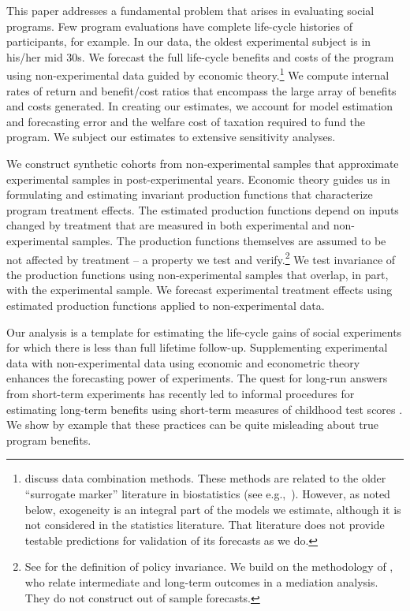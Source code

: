 This paper addresses a fundamental problem that arises in evaluating social programs. Few program evaluations have complete life-cycle histories of participants, for example. In our data, the oldest experimental subject is in his/her mid 30s. We forecast the full life-cycle benefits and costs of the program using non-experimental data guided by economic theory.\footnote{\citet{Ridder_Moffitt_2007_hbk_metricsdata} discuss data combination methods. These methods are related to the older ``surrogate marker'' literature in biostatistics (see e.g.,\ \citealp{Prentice_1989_Surrogate_SiM}). However, as noted below, exogeneity is an integral part of the models we estimate, although it is not considered in the statistics literature. That literature does not provide testable predictions for validation of its forecasts as we do.} We compute internal rates of return and benefit/cost ratios that encompass the large array of benefits and costs generated. In creating our estimates, we account for model estimation and forecasting error and the welfare cost of taxation required to fund the program. We subject our estimates to extensive sensitivity analyses.

We construct synthetic cohorts from non-experimental samples that approximate experimental samples in post-experimental years. Economic theory guides us in formulating and estimating invariant production functions that characterize program treatment effects. The estimated production functions depend on inputs changed by treatment that are measured in both experimental and non-experimental samples. The production functions themselves are assumed to be not affected by treatment -- a property we test and verify.\footnote{See \cite{Hurwicz_1962_structural} for the definition of policy invariance. We build on the methodology of \citet{Heckman_Pinto_etal_2013_PerryFactor}, who relate intermediate and long-term outcomes in a mediation analysis. They do not construct out of sample forecasts.} We test invariance of the production functions using non-experimental samples that overlap, in part, with the experimental sample. We forecast experimental treatment effects using estimated production functions applied to non-experimental data.

Our analysis is a template for estimating the life-cycle gains of social experiments for which there is less than full lifetime follow-up. Supplementing experimental data with non-experimental data using economic and econometric theory enhances the forecasting power of experiments. The quest for long-run answers from short-term experiments has recently led to informal procedures for estimating long-term benefits using short-term measures of childhood test scores \citep[e.g.][]{Chetty_Friedman_etal_2011_QJoE,Kline_Walters_2016_QJE}. We show by example that these practices can be quite misleading about true program benefits.

